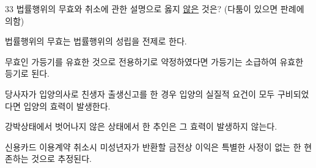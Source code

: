 \begin{question}{33}
법률행위의 무효와 취소에 관한 설명으로 옳지 \uline{않은} 것은? (다툼이 있으면 판례에 의함)
\begin{choices}
  \item 법률행위의 무효는 법률행위의 성립을 전제로 한다.
  \item 무효인 가등기를 유효한 것으로 전용하기로 약정하였다면 가등기는 소급하여 유효한 등기로 된다.
  \item 당사자가 입양의사로 친생자 출생신고를 한 경우 입양의 실질적 요건이 모두 구비되었다면 입양의 효력이 발생한다.
  \item 강박상태에서 벗어나지 않은 상태에서 한 추인은 그 효력이 발생하지 않는다.
  \item 신용카드 이용계약 취소시 미성년자가 반환할 금전상 이익은 특별한 사정이 없는 한 현존하는 것으로 추정된다.
\end{choices}
\end{question}
